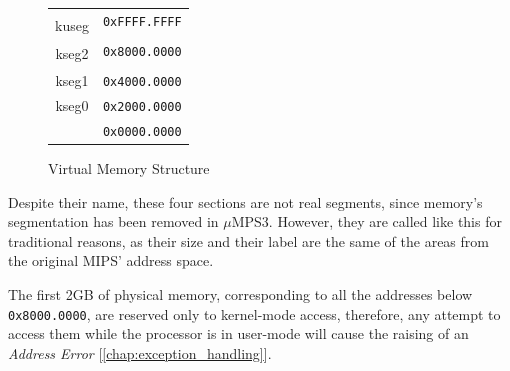 \documentclass[12pt,a4paper,openright,twoside]{report}
\begin{document}
\begin{figure}[h]
	\centering
	\renewcommand{\arraystretch}{0.66}
	\begin{tabular}{cl}
		\multicolumn{1}{m{3cm}}{}                    & \multirow{2}{*}{\texttt{0xFFFF.FFFF}} \\ \cline{1-1}
		\multicolumn{1}{|c|}{\multirow{4}{*}{kuseg}} &                                       \\
		\multicolumn{1}{|c|}{}                       & \multirow{2}{*}{}                     \\
		\multicolumn{1}{|c|}{}                       &                                       \\
		\multicolumn{1}{|c|}{}                       & \multirow{2}{*}{\texttt{0x8000.0000}} \\ \cline{1-1}
		\multicolumn{1}{|c|}{\multirow{4}{*}{kseg2}} &                                       \\
		\multicolumn{1}{|c|}{}                       & \multirow{2}{*}{}                     \\
		\multicolumn{1}{|c|}{}                       &                                       \\
		\multicolumn{1}{|c|}{}                       & \multirow{2}{*}{\texttt{0x4000.0000}} \\ \cline{1-1}
		\multicolumn{1}{|c|}{\multirow{2}{*}{kseg1}} &                                       \\
		\multicolumn{1}{|c|}{}                       & \multirow{2}{*}{\texttt{0x2000.0000}} \\ \cline{1-1}
		\multicolumn{1}{|c|}{\multirow{2}{*}{kseg0}} &                                       \\
		\multicolumn{1}{|c|}{}                       & \multirow{2}{*}{\texttt{0x0000.0000}} \\ \cline{1-1}
		\multicolumn{1}{l}{}                         &
	\end{tabular}
	\caption{Virtual Memory Structure}
	\label{fig:virtual_memory}
\end{figure}
Despite their name, these four sections are not real segments, since memory's segmentation has been removed in $\mu$MPS3.
However, they are called like this for traditional reasons, as their size and their label are the same of the areas from the original MIPS' address space.

The first 2GB of physical memory, corresponding to all the addresses below \texttt{0x8000.0000}, are reserved only to kernel-mode access, therefore, any attempt to access them while the processor is in user-mode will cause the raising of an \textit{Address Error} [\autoref{chap:exception_handling}].
\end{document}
